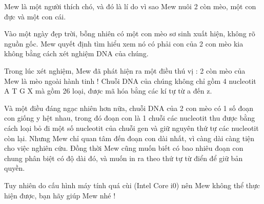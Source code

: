 Mew là một người thích chó, và đó là lí do vì sao Mew nuôi 2 còn mèo, một con đực và một con cái.  

   Vào một ngày đẹp trời, bỗng nhiên có một con mèo sơ sinh xuất hiện, không rõ nguồn gốc. Mew quyết định tìm hiểu xem nó có phải con của 2 con mèo kia không bằng cách xét nghiệm DNA của chúng.  

   Trong lúc xét nghiệm, Mew đã phát hiện ra một điều thú vị : 2 còn mèo của Mew là mèo ngoài hành tinh ! Chuỗi DNA của chúng không chỉ gồm 4 nucleotit A T G X mà gồm 26 loại, được mã hóa bằng các kí tự từ a đến z.  

   Và một điều đáng ngạc nhiên hơn nữa, chuỗi DNA của 2 con mèo có 1 số đoạn con giống y hệt nhau, trong đó đoạn con là 1 chuỗi các nucleotit thu được bằng cách loại bỏ đi một số nucleotit của chuỗi gen và giữ nguyên thứ tự các nucleotit còn lại. Nhưng Mew chỉ quan tâm đến đoạn con dài nhất, vì càng dài càng tiện cho việc nghiên cứu. Đồng thời Mew cũng muốn biết có bao nhiêu đoạn con chung phân biệt có độ dài đó, và muốn in ra theo thứ tự từ điển để giữ bản quyền.  

   Tuy nhiên do cấu hình máy tính quá cùi (Intel Core i0) nên Mew không thể thực hiện được, bạn hãy giúp Mew nhé !  

\